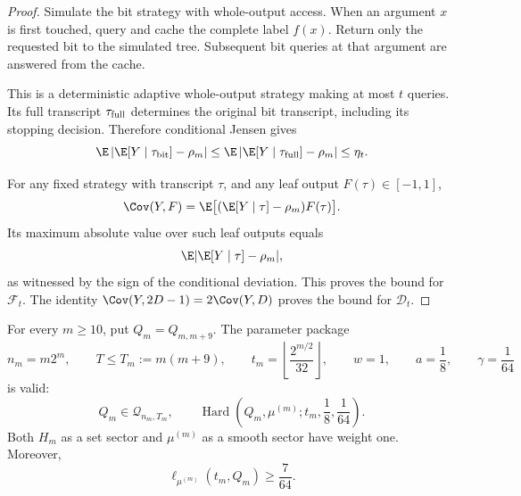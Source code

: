 \begin{proof}
Simulate the bit strategy with whole-output access. When an argument \(x\) is first touched, query and cache the complete label \(f(x)\). Return only the requested bit to the simulated tree. Subsequent bit queries at that argument are answered from the cache.

This is a deterministic adaptive whole-output strategy making at most \(t\) queries. Its full transcript \(\tau_{\rm full}\) determines the original bit transcript, including its stopping decision. Therefore conditional Jensen gives
\[
 \E\left|\E[Y\mid\tau_{\rm bit}]-\rho_m\right|
 \le
 \E\left|\E[Y\mid\tau_{\rm full}]-\rho_m\right|
 \le\eta_t.
\]

For any fixed strategy with transcript \(\tau\), and any leaf output \(F(\tau)\in[-1,1]\),
\[
 \Cov(Y,F)
 =\E\bigl[(\E[Y\mid\tau]-\rho_m)F(\tau)\bigr].
\]
Its maximum absolute value over such leaf outputs equals
\[
 \E|\E[Y\mid\tau]-\rho_m|,
\]
as witnessed by the sign of the conditional deviation. This proves the bound for \(\mathcal F_t\). The identity
\(\Cov(Y,2D-1)=2\Cov(Y,D)\) proves the bound for \(\mathcal D_t\).
\end{proof}

\begin{theorem}\label{ian:simon-sector-theorem}
For every \(m\ge10\), put \(Q_m=Q_{m,m+9}\). The parameter package
\[
 n_m=m2^m,\qquad
 T\le T_m:=m(m+9),\qquad
 t_m=\left\lfloor\frac{2^{m/2}}{32}\right\rfloor,\qquad
 w=1,\qquad a=\frac18,\qquad\gamma=\frac1{64}
 \tag{30.2}
\]
is valid:
\[
 Q_m\in\mathcal Q_{n_m,T_m},
 \qquad
 \operatorname{Hard}
 \left(Q_m,\mu^{(m)};t_m,\frac18,\frac1{64}\right).
\]
Both \(H_m\) as a set sector and \(\mu^{(m)}\) as a smooth sector have weight one. Moreover,
\[
 \ell_{\mu^{(m)}}(t_m,Q_m)\ge\frac7{64}.
\]
\end{theorem}

